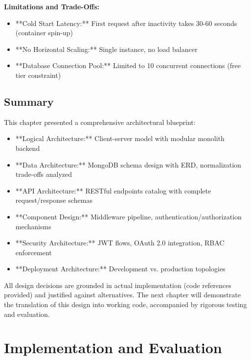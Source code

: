 \documentclass[12pt, a4paper]{report}
\begin{document}
\textbf{Limitations and Trade-Offs:}
\begin{itemize}
    \item **Cold Start Latency:** First request after inactivity takes 30-60 seconds (container spin-up)
    \item **No Horizontal Scaling:** Single instance, no load balancer
    \item **Database Connection Pool:** Limited to 10 concurrent connections (free tier constraint)
\end{itemize}

\section{Summary}

This chapter presented a comprehensive architectural blueprint:

\begin{itemize}
    \item **Logical Architecture:** Client-server model with modular monolith backend
    \item **Data Architecture:** MongoDB schema design with ERD, normalization trade-offs analyzed
    \item **API Architecture:** RESTful endpoints catalog with complete request/response schemas
    \item **Component Design:** Middleware pipeline, authentication/authorization mechanisms
    \item **Security Architecture:** JWT flows, OAuth 2.0 integration, RBAC enforcement
    \item **Deployment Architecture:** Development vs. production topologies
\end{itemize}

All design decisions are grounded in actual implementation (code references provided) and justified against alternatives. The next chapter will demonstrate the translation of this design into working code, accompanied by rigorous testing and evaluation.


\chapter{Implementation and Evaluation}
\end{document}
